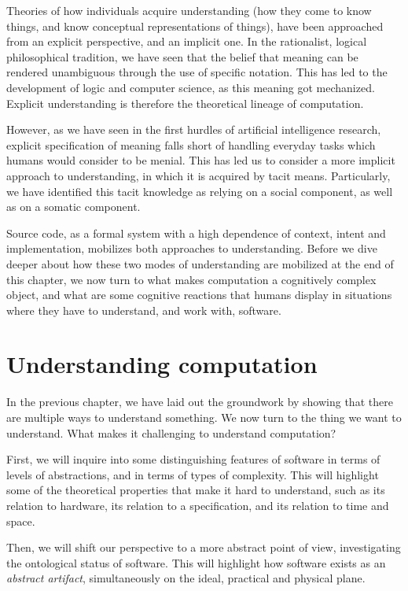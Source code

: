 Theories of how individuals acquire understanding (how they come to know things, and know conceptual representations of things), have been approached from an explicit perspective, and an implicit one. In the rationalist, logical philosophical tradition, we have seen that the belief that meaning can be rendered unambiguous through the use of specific notation. This has led to the development of logic and computer science, as this meaning got mechanized. Explicit understanding is therefore the theoretical lineage of computation.

However, as we have seen in the first hurdles of artificial intelligence research, explicit specification of meaning falls short of handling everyday tasks which humans would consider to be menial. This has led us to consider a more implicit approach to understanding, in which it is acquired by tacit means. Particularly, we have identified this tacit knowledge as relying on a social component, as well as on a somatic component.

Source code, as a formal system with a high dependence of context, intent and implementation, mobilizes both approaches to understanding. Before we dive deeper about how these two modes of understanding are mobilized at the end of this chapter, we now turn to what makes computation a cognitively complex object, and what are some cognitive reactions that humans display in situations where they have to understand, and work with, software.

\clearpage

\section{Understanding computation}

In the previous chapter, we have laid out the groundwork by showing that there are multiple ways to understand something. We now turn to the thing we want to understand. What makes it challenging to understand computation?

First, we will inquire into some distinguishing features of software in terms of levels of abstractions, and in terms of types of complexity. This will highlight some of the theoretical properties that make it hard to understand, such as its relation to hardware, its relation to a specification, and its relation to time and space.

Then, we will shift our perspective to a more abstract point of view, investigating the ontological status of software. This will highlight how software exists as an \emph{abstract artifact}, simultaneously on the ideal, practical and physical plane.

